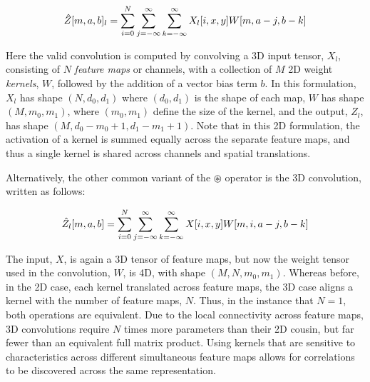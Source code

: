 \begin{equation}
\label{eq:convolution}
\small
\hat{Z}[m, a, b]_l =\sum_{i=0}^{N} \sum_{j=-\infty}^{\infty} \sum_{k=-\infty}^{\infty} X_l[i, x, y]W[m, a - j, b - k]
\end{equation}

\noindent Here the valid convolution is computed by convolving a 3D input tensor, $X_l$, consisting of $N$ \emph{feature maps} or channels, with a collection of $M$ 2D weight \emph{kernels}, $W$, followed by the addition of a vector bias term $b$.
In this formulation, $X_l$ has shape $(N, d_0, d_1)$ where $(d_0,d_1)$ is the shape of each map, $W$ has shape $(M, m_0, m_1)$, where $(m_0,m_1)$ define the size of the kernel, and the output, $Z_l$, has shape $(M, d_0-m_0+1, d_1-m_1+1)$.
Note that in this 2D formulation, the activation of a kernel is summed equally across the separate feature maps, and thus a single kernel is shared across channels and spatial translations.

Alternatively, the other common variant of the $\circledast$ operator is the 3D convolution, written as follows:

\begin{equation}
\label{eq:convolution}
\small
\hat{Z}_l[m, a, b] =\sum_{i=0}^{N} \sum_{j=-\infty}^{\infty} \sum_{k=-\infty}^{\infty} X[i, x, y]W[m, i, a - j, b - k]
\end{equation}

\noindent The input, $X$, is again a 3D tensor of feature maps, but now the weight tensor used in the convolution, $W$, is 4D, with shape $(M, N, m_0, m_1)$.
Whereas before, in the 2D case, each kernel translated across feature maps, the 3D case aligns a kernel with the number of feature maps, $N$.
Thus, in the instance that $N=1$, both operations are equivalent.
Due to the local connectivity across feature maps, 3D convolutions require $N$ times more parameters than their 2D cousin, but far fewer than an equivalent full matrix product.
Using kernels that are sensitive to characteristics across different simultaneous feature maps allows for correlations to be discovered across the same representation.




